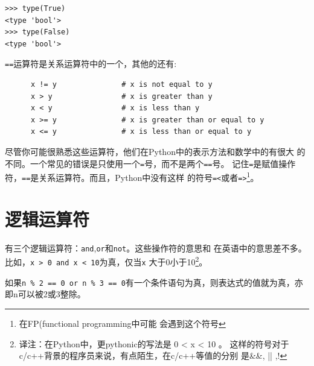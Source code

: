 \beforeverb
\begin{verbatim}
>>> type(True)
<type 'bool'>
>>> type(False)
<type 'bool'>
\end{verbatim}
\afterverb

{\tt ==}运算符是关系运算符中的一个，其他的还有:

\beforeverb
\begin{verbatim}
      x != y               # x is not equal to y
      x > y                # x is greater than y
      x < y                # x is less than y
      x >= y               # x is greater than or equal to y
      x <= y               # x is less than or equal to y
\end{verbatim}
\afterverb


尽管你可能很熟悉这些运算符，他们在Python中的表示方法和数学中的有很大
的不同。一个常见的错误是只使用一个{\tt =}号，而不是两个{\tt ==}号。
记住{\tt =}是赋值操作符，{\tt ==}是关系运算符。而且，Python中没有这样
的符号{\tt =<}或者{\tt =>}\footnote{在FP(functional programming中可能
会遇到这个符号}。


\section{逻辑运算符}

有三个逻辑运算符：{\tt and},{\tt or}和{\tt not}。这些操作符的意思和
在英语中的意思差不多。比如，{\tt x > 0 and x < 10}为真，仅当{\tt x}
大于0小于10\footnote{译注：在Python中，更pythonic的写法是 0 < x < 10
。  这样的符号对于c/c++背景的程序员来说，有点陌生，在c/c++等值的分别
是\&\&, || ,!}。


如果{\tt n \% 2 == 0 or n \% 3 == 0}有一个条件语句为真，则表达式的值就为真，亦即n可以被2或3整除。\\

